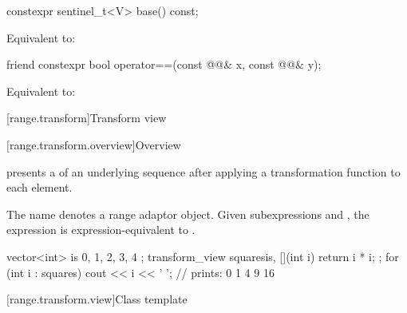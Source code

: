 %
\begin{itemdecl}
constexpr sentinel_t<V> base() const;
\end{itemdecl}

\begin{itemdescr}
\pnum
\effects
Equivalent to: 
\end{itemdescr}

%
\begin{itemdecl}
friend constexpr bool operator==(const @@& x, const @@& y);
\end{itemdecl}

\begin{itemdescr}
\pnum
\effects
Equivalent to: 
\end{itemdescr}

[range.transform]{Transform view}

[range.transform.overview]{Overview}

\pnum
{} presents
a  of an underlying sequence after
applying a transformation function to each element.

\pnum
The name  denotes a
range adaptor object.
Given subexpressions  and , the expression
 is expression-equivalent to
.

\pnum
\begin{example}
\begin{codeblock}
vector<int> is{ 0, 1, 2, 3, 4 };
transform_view squares{is, [](int i) { return i * i; }};
for (int i : squares)
  cout << i << ' '; // prints: 0 1 4 9 16
\end{codeblock}
\end{example}

[range.transform.view]{Class template }

